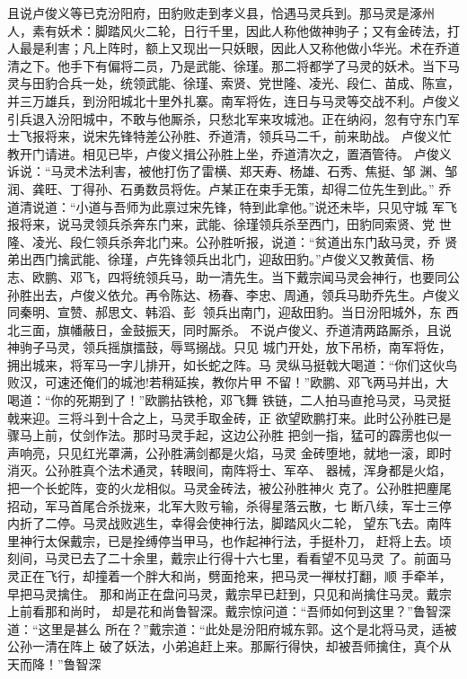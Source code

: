且说卢俊义等已克汾阳府，田豹败走到孝义县，恰遇马灵兵到。那马灵是涿州
人，素有妖术：脚踏风火二轮，日行千里，因此人称他做神驹子；又有金砖法，打
人最是利害；凡上阵时，额上又现出一只妖眼，因此人又称他做小华光。术在乔道
清之下。他手下有偏将二员，乃是武能、徐瑾。那二将都学了马灵的妖术。当下马
灵与田豹合兵一处，统领武能、徐瑾、索贤、党世隆、凌光、段仁、苗成、陈宣，
并三万雄兵，到汾阳城北十里外扎寨。南军将佐，连日与马灵等交战不利。卢俊义
引兵退入汾阳城中，不敢与他厮杀，只愁北军来攻城池。正在纳闷，忽有守东门军
士飞报将来，说宋先锋特差公孙胜、乔道清，领兵马二千，前来助战。
卢俊义忙教开门请进。相见已毕，卢俊义揖公孙胜上坐，乔道清次之，置酒管待。
卢俊义诉说：“马灵术法利害，被他打伤了雷横、郑天寿、杨雄、石秀、焦挺、邹
渊、邹润、龚旺、丁得孙、石勇数员将佐。卢某正在束手无策，却得二位先生到此。”
乔道清说道：“小道与吾师为此禀过宋先锋，特到此拿他。”说还未毕，只见守城
军飞报将来，说马灵领兵杀奔东门来，武能、徐瑾领兵杀至西门，田豹同索贤、党
世隆、凌光、段仁领兵杀奔北门来。公孙胜听报，说道：“贫道出东门敌马灵，乔
贤弟出西门擒武能、徐瑾，卢先锋领兵出北门，迎敌田豹。”卢俊义又教黄信、杨
志、欧鹏、邓飞，四将统领兵马，助一清先生。当下戴宗闻马灵会神行，也要同公
孙胜出去，卢俊义依允。再令陈达、杨春、李忠、周通，领兵马助乔先生。卢俊义
同秦明、宣赞、郝思文、韩滔、彭，领兵出南门，迎敌田豹。当日汾阳城外，东
西北三面，旗幡蔽日，金鼓振天，同时厮杀。
不说卢俊义、乔道清两路厮杀，且说神驹子马灵，领兵摇旗擂鼓，辱骂搦战。只见
城门开处，放下吊桥，南军将佐，拥出城来，将军马一字儿排开，如长蛇之阵。马
灵纵马挺戟大喝道：“你们这伙鸟败汉，可速还俺们的城池!若稍延挨，教你片甲
不留！”欧鹏、邓飞两马并出，大喝道：“你的死期到了！”欧鹏拈铁枪，邓飞舞
铁链，二人拍马直抢马灵，马灵挺戟来迎。三将斗到十合之上，马灵手取金砖，正
欲望欧鹏打来。此时公孙胜已是骤马上前，仗剑作法。那时马灵手起，这边公孙胜
把剑一指，猛可的霹雳也似一声响亮，只见红光罩满，公孙胜满剑都是火焰，马灵
金砖堕地，就地一滚，即时消灭。公孙胜真个法术通灵，转眼间，南阵将士、军卒、
器械，浑身都是火焰，把一个长蛇阵，变的火龙相似。马灵金砖法，被公孙胜神火
克了。公孙胜把麈尾招动，军马首尾合杀拢来，北军大败亏输，杀得星落云散，七
断八续，军士三停内折了二停。马灵战败逃生，幸得会使神行法，脚踏风火二轮，
望东飞去。南阵里神行太保戴宗，已是拴缚停当甲马，也作起神行法，手挺朴刀，
赶将上去。顷刻间，马灵已去了二十余里，戴宗止行得十六七里，看看望不见马灵
了。前面马灵正在飞行，却撞着一个胖大和尚，劈面抢来，把马灵一禅杖打翻，顺
手牵羊，早把马灵擒住。
那和尚正在盘问马灵，戴宗早已赶到，只见和尚擒住马灵。戴宗上前看那和尚时，
却是花和尚鲁智深。戴宗惊问道：“吾师如何到这里？”鲁智深道：“这里是甚么
所在？”戴宗道：“此处是汾阳府城东郭。这个是北将马灵，适被公孙一清在阵上
破了妖法，小弟追赶上来。那厮行得快，却被吾师擒住，真个从天而降！”鲁智深
